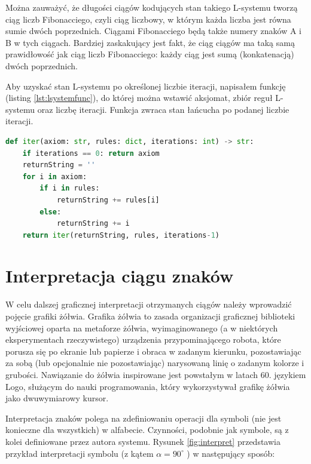 \documentclass[a4paper,12pt,twoside]{book} %
\begin{document}
Można zauważyć, że długości ciągów kodujących stan takiego L-systemu tworzą ciąg liczb Fibonacciego,
czyli ciąg liczbowy, w którym każda liczba jest równa sumie dwóch
poprzednich. Ciągami Fibonacciego będą także numery znaków A i B
w tych ciągach. Bardziej zaskakujący jest fakt, że ciąg ciągów ma
taką samą prawidłowość jak ciąg liczb Fibonacciego: każdy ciąg jest sumą
(konkatenacją) dwóch poprzednich.

Aby uzyskać stan L-systemu po określonej liczbie iteracji, 
napisałem funkcję (listing \ref{lst:lsystemfunc}), do której można wstawić aksjomat, 
zbiór reguł L-systemu oraz liczbę iteracji. 
Funkcja zwraca stan łańcucha po podanej liczbie iteracji.

\begin{lstlisting}[language=Python, caption={Funkcja, która zwraca stan systemu po określonej liczbie iteracji}, label={lst:lsystemfunc}]
	def iter(axiom: str, rules: dict, iterations: int) -> str:
    if iterations == 0: return axiom
    returnString = ''
    for i in axiom:
        if i in rules:
            returnString += rules[i]
        else:
            returnString += i
    return iter(returnString, rules, iterations-1)
\end{lstlisting}


\section{Interpretacja ciągu znaków}

W celu dalszej graficznej interpretacji otrzymanych ciągów
należy wprowadzić pojęcie grafiki żółwia. Grafika żółwia
to zasada organizacji graficznej biblioteki wyjściowej oparta 
na metaforze żółwia, wyimaginowanego 
(a w niektórych eksperymentach rzeczywistego) urządzenia 
przypominającego robota, które porusza się po ekranie 
lub papierze i obraca w zadanym kierunku, 
pozostawiając za sobą (lub opcjonalnie nie pozostawiając) 
narysowaną linię o zadanym kolorze i grubości.
Nawiązanie do żółwia inspirowane jest powstałym w latach 60. 
językiem Logo, służącym do nauki programowania, 
który wykorzystywał grafikę żółwia jako dwuwymiarowy kursor.


Interpretacja znaków polega na zdefiniowaniu operacji dla symboli
(nie jest konieczne dla wszystkich) w alfabecie. Czynności, podobnie 
jak symbole, są z kolei definiowane
przez autora systemu. Rysunek \ref{fig:interpret} przedstawia przykład interpretacji
symbolu (z kątem $\alpha = 90^\circ$ ) w następujący sposób:
\end{document}
